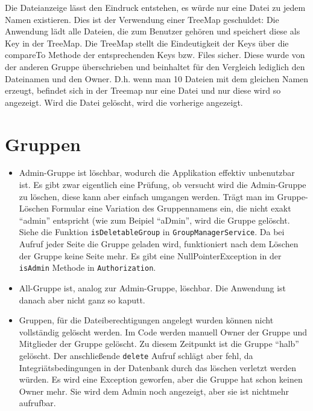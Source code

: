 \documentclass[12pt,DIV14,BCOR10mm,a4paper,parskip=half-,headsepline,headinclude,english,ngerman,bibliography=totocnumbered]{scrreprt}
\begin{document}
\begin{itemize}
  Die Dateianzeige lässt den Eindruck entstehen, es würde nur eine Datei zu jedem Namen existieren. Dies ist der Verwendung einer TreeMap geschuldet: Die Anwendung lädt alle Dateien, die zum Benutzer gehören und speichert diese als Key in der TreeMap. Die TreeMap stellt die Eindeutigkeit der Keys über die compareTo Methode der entsprechenden Keys bzw. Files sicher. Diese wurde von der anderen Gruppe überschrieben und beinhaltet für den Vergleich lediglich den Dateinamen und den Owner. D.h. wenn man 10 Dateien mit dem gleichen Namen erzeugt, befindet sich in der Treemap nur eine Datei und nur diese wird so angezeigt. Wird die Datei gelöscht, wird die vorherige angezeigt.
  \end{itemize}



\section{Gruppen}
\begin{itemize}
\item Admin-Gruppe ist löschbar, wodurch die Applikation effektiv unbenutzbar ist. Es gibt zwar eigentlich eine Prüfung, ob versucht wird die Admin-Gruppe zu löschen, diese kann aber einfach umgangen werden. Trägt man im Gruppe-Löschen Formular eine Variation des Gruppennamens ein, die nicht exakt \enquote{admin} entspricht (wie zum Beipiel \enquote{aDmin}, wird die Gruppe gelöscht. Siehe die Funktion \texttt{isDeletableGroup} in \texttt{GroupManagerService}. Da bei Aufruf jeder Seite die Gruppe geladen wird, funktioniert nach dem Löschen der Gruppe keine Seite mehr. Es gibt eine NullPointerException in der \texttt{isAdmin} Methode in \texttt{Authorization}.
\item All-Gruppe ist, analog zur Admin-Gruppe, löschbar. Die Anwendung ist danach aber nicht ganz so kaputt.
\item Gruppen, für die Dateiberechtigungen angelegt wurden können nicht vollständig gelöscht werden. Im Code werden manuell Owner der Gruppe und Mitglieder der Gruppe gelöscht. Zu diesem Zeitpunkt ist die Gruppe \enquote{halb} gelöscht. Der anschließende \texttt{delete} Aufruf schlägt aber fehl, da Integriätsbedingungen in der Datenbank durch das löschen verletzt werden würden. Es wird eine Exception geworfen, aber die Gruppe hat schon keinen Owner mehr. Sie wird dem Admin noch angezeigt, aber sie ist nichtmehr aufrufbar.
\end{itemize}
\end{document}
